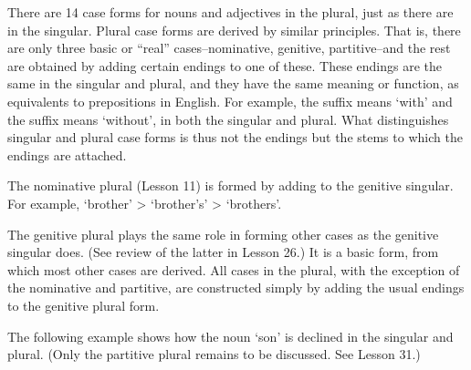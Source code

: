 \newLesson %

\Grammar %


\newSection There are 14 case forms for nouns and adjectives in the plural, just as there are in the singular. Plural case forms are derived by similar principles. That is, there are only three basic or ``real'' cases--nominative, genitive, partitive--and the rest are obtained by adding certain endings to one of these. These endings are the same in the singular and plural, and they have the same meaning or function, as equivalents to prepositions in English. For example, the suffix  means `with' and the suffix  means `without', in both the singular and plural. What distinguishes singular and plural case forms is thus not the endings but the stems to which the endings are attached.

\newSection The nominative plural (Lesson 11) is formed by adding  to the genitive singular. For example, \nom \sing {} `brother' > \gen \sing {} `brother's' > \nom \pl {} `brothers'.

\newSection The genitive plural plays the same role in forming other cases as the genitive singular does. (See review of the latter in Lesson 26.) It is a basic form, from which most other cases are derived. All cases in the plural, with the exception of the nominative and partitive, are constructed simply by adding the usual endings to the genitive plural form.

\newSection The following example shows how the noun  `son' is declined in the singular and plural. (Only the partitive plural remains to be discussed. See Lesson 31.)

